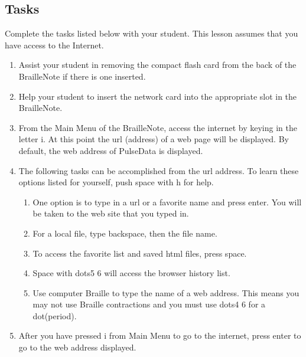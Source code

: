 \documentclass[10pt,letterpaper,twoside]{report}
\begin{document}
{{{{ \subsection{Tasks}



Complete the tasks listed below with your student.  This lesson assumes that you have access to the Internet.



\begin{enumerate}
	\item Assist your student in removing the compact flash card from the back of the BrailleNote if there is one inserted.
	      
	\item Help your student to insert the network card into the appropriate slot in the BrailleNote.
	      
	\item From the Main Menu of the BrailleNote, access the internet by keying in the letter i. At this point the url (address) of a web page will be displayed.  By default, the web address of PulseData is displayed.
	      
	\item The following tasks can be accomplished from the url address.  To learn these options listed for yourself, push space with h for help.
	      
	      \begin{enumerate}
		      \item One option is to type in a url or a favorite name and press enter.  You will be taken to the web site that you typed in.
		            
		      \item For a local file, type backspace, then the file name.
		            
		      \item To access the favorite list and saved html files, press space.
		            
		      \item Space with dots5 6 will access the browser history list.
		            
		      \item Use computer Braille to type the name of a web address.  This means you may not use Braille contractions and you must use dots4 6 for a dot(period).
	      \end{enumerate}
	\item After you have pressed i from Main Menu to go to the internet, press enter to go to the web address displayed.
	      

\end{enumerate}}}}}
\end{document}
